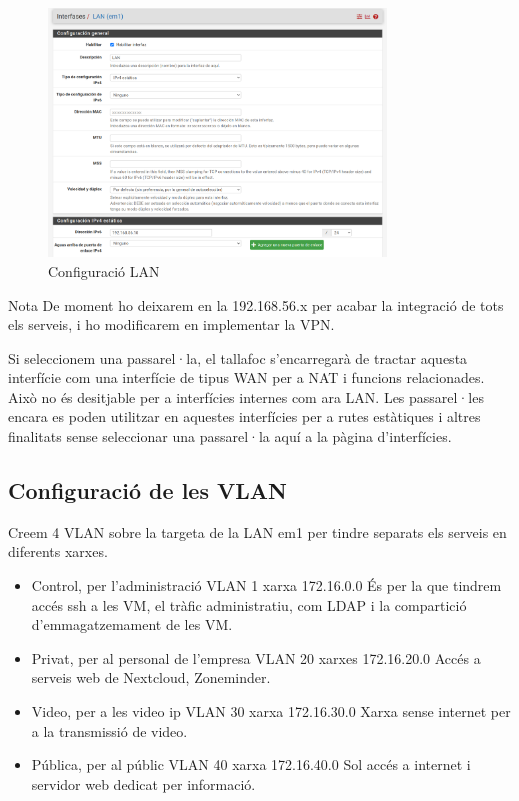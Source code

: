 \documentclass[
  10pt,
]{krantz}
\providecommand{\tightlist}{%
  \setlength{\itemsep}{0pt}\setlength{\parskip}{0pt}}
\begin{document}
\begin{figure}
\centering
\includegraphics[width=0.8\textwidth,height=\textheight]{imatges/pfsense_LAN.png}
\caption{Configuració LAN}
\end{figure}

\begin{rmdnote}{Nota}
De moment ho deixarem en la 192.168.56.x per acabar la integració de tots els serveis, i ho modificarem en implementar la VPN.

Si seleccionem una passarel·la, el tallafoc s'encarregarà de tractar aquesta interfície com una interfície de tipus WAN per a NAT i funcions relacionades. Això no és desitjable per a interfícies internes com ara LAN. Les passarel·les encara es poden utilitzar en aquestes interfícies per a rutes estàtiques i altres finalitats sense seleccionar una passarel·la aquí a la pàgina d'interfícies.

\end{rmdnote}

\hypertarget{configuraciuxf3-de-les-vlan}{%
\subsection{Configuració de les VLAN}\label{configuraciuxf3-de-les-vlan}}

Creem 4 VLAN sobre la targeta de la LAN em1 per tindre separats els serveis en diferents xarxes.

\begin{itemize}
\tightlist
\item
  Control, per l'administració VLAN 1 xarxa 172.16.0.0 És per la que tindrem accés ssh a les VM, el tràfic administratiu, com LDAP i la compartició d'emmagatzemament de les VM.
\item
  Privat, per al personal de l'empresa VLAN 20 xarxes 172.16.20.0 Accés a serveis web de Nextcloud, Zoneminder.
\item
  Video, per a les video ip VLAN 30 xarxa 172.16.30.0 Xarxa sense internet per a la transmissió de video.
\item
  Pública, per al públic VLAN 40 xarxa 172.16.40.0 Sol accés a internet i servidor web dedicat per informació.
\end{itemize}
\end{document}
